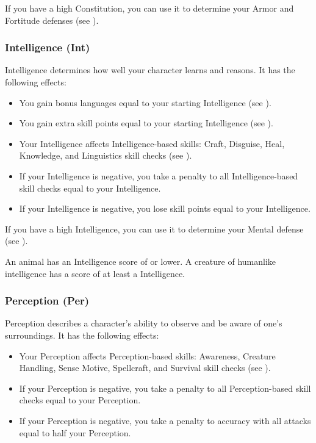            If you have a high Constitution, you can use it to determine your Armor and Fortitude defenses (see ).

        \subsubsection{Intelligence (Int)}\label{Intelligence}
            Intelligence determines how well your character learns and reasons.
            It has the following effects:

            \begin{itemize}
                \item You gain bonus languages equal to your starting Intelligence (see ).
                \item You gain extra skill points equal to your starting Intelligence (see ).
                \item Your Intelligence affects Intelligence-based skills: Craft, Disguise, Heal, Knowledge, and Linguistics skill checks (see ).
                \item If your Intelligence is negative, you take a penalty to all Intelligence-based skill checks equal to your Intelligence.
                \item If your Intelligence is negative, you lose skill points equal to your Intelligence.
            \end{itemize}

            If you have a high Intelligence, you can use it to determine your Mental defense (see ).

            \par An animal has an Intelligence score of  or lower.
            A creature of humanlike intelligence has a score of at least a  Intelligence.

        \subsubsection{Perception (Per)}\label{Perception}
            Perception describes a character's ability to observe and be aware of one's surroundings.
            It has the following effects:
            \begin{itemize}
                \item Your Perception affects Perception-based skills: Awareness, Creature Handling, Sense Motive, Spellcraft, and Survival skill checks (see ).
                \item If your Perception is negative, you take a penalty to all Perception-based skill checks equal to your Perception.
                \item If your Perception is negative, you take a penalty to accuracy with all attacks equal to half your Perception.
            \end{itemize}

